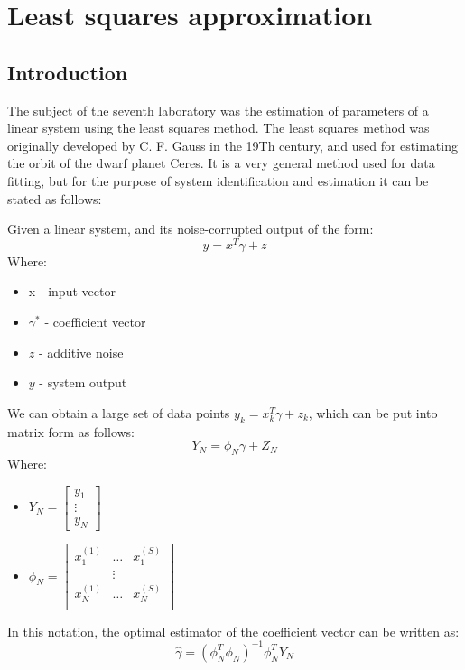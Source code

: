 \chapter{Least squares approximation}
\section{Introduction}
The subject of the seventh laboratory was the estimation of parameters
of a linear system using the least squares method.
The least squares method was originally developed by C. F. Gauss in the 19Th century, and used for estimating the orbit of the dwarf planet Ceres. It is a very general method used for data fitting, but for the purpose of system identification and estimation it can be stated as follows:

{
Given a linear system, and its noise-corrupted output of the form:
\begin{equation}
    y = x^{T}\gamma + z
\end{equation}
Where:
\begin{itemize}
        \item x - input vector
        \item $\gamma^{*}$ - coefficient vector
        \item $z$ - additive noise 
        \item $y$ - system output
\end{itemize}
We can obtain a large set of data points $y_k = x_k^{T}\gamma + z_k$, which 
can be put into matrix form as follows:
\begin{equation}
    Y_N = \phi_N\gamma + Z_N
\end{equation}
Where:
\begin{itemize}
    \item $Y_N = \begin{bmatrix}
        y_1 \\ \vdots \\ y_N
    \end{bmatrix}$ 
\item $\phi_N = \begin{bmatrix}
        x_1^{(1)} & \dots & x_1^{(S)}  \\
                  &\vdots &\\
        x_N^{(1)} & \dots & x_N^{(S)}  \\

\end{bmatrix}$
\end{itemize}
In this notation, the optimal estimator of the coefficient vector can be
written as:
\begin{equation}
\hat{\gamma} = (\phi_N^{T}\phi_N)^{-1}\phi^{T}_N Y_N 
\end{equation}
}
\clearpage
